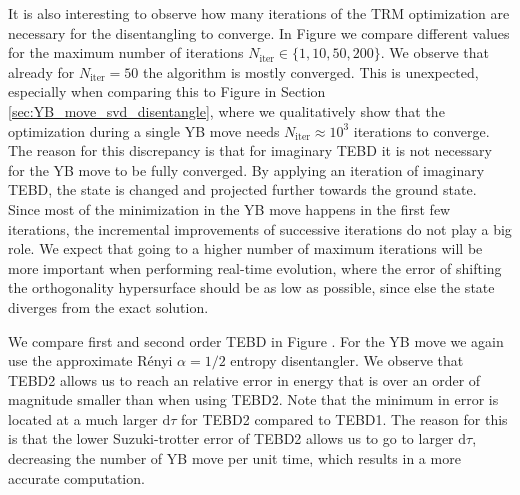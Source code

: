 %

%
It is also interesting to observe how many iterations of the TRM optimization are necessary for the disentangling to converge. In Figure  we compare different values for the maximum number of iterations $N_\text{iter} \in \{1, 10, 50, 200\}$. We observe that already for $N_\text{iter} = 50$ the algorithm is mostly converged. This is unexpected, especially when comparing this to Figure  in Section \ref{sec:YB_move_svd_disentangle}, where we qualitatively show that the optimization during a single YB move needs $N_\text{iter} \approx 10^{3}$ iterations to converge. The reason for this discrepancy is that for imaginary TEBD it is not necessary for the YB move to be fully converged. By applying an iteration of imaginary TEBD, the state is changed and projected further towards the ground state. Since most of the minimization in the YB move happens in the first few iterations, the incremental improvements of successive iterations do not play a big role. We expect that going to a higher number of maximum iterations will be more important when performing real-time evolution, where the error of shifting the orthogonality hypersurface should be as low as possible, since else the state diverges from the exact solution. \par

We compare first and second order TEBD in Figure . For the YB move we again use the approximate Rényi $\alpha=1/2$ entropy disentangler. We observe that TEBD2 allows us to reach an relative error in energy that is over an order of magnitude smaller than when using TEBD2. Note that the minimum in error is located at a much larger $\text{d}\tau$ for TEBD2 compared to TEBD1. The reason for this is that the lower Suzuki-trotter error of TEBD2 allows us to go to larger $\text{d}\tau$, decreasing the number of YB move per unit time, which results in a more accurate computation. \par
%



%
